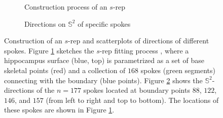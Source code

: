 \documentclass[oneside,11pt]{article}
\begin{document}
\begin{figure}[htpb!]
    \centering
     \begin{subfigure}[b]{0.5\textwidth}
        \caption{\small Construction process of an $s$-rep}
        \label{fig:srepa}
    \end{subfigure}%
    \hspace*{0.25cm}%
    \begin{subfigure}[b]{0.5\textwidth}
        \centering
    \caption{\small Directions on $\mathbb{S}^2$ of specific spokes}
    \label{fig:srepb}
    \end{subfigure}%
    \caption{\small Construction of an $s$-rep and scatterplots of directions of different spokes. Figure \ref{fig:srepa} sketches the $s$-rep fitting process \citep{liu2021fitting}, where a hippocampus surface (blue, top) is parametrized as a set of base skeletal points (red) and a collection of $168$ spokes (green segments) connecting with the boundary (blue points). Figure \ref{fig:srepb} shows the $\mathbb{S}^2$-directions of the $n=177$ spokes located at boundary points $88$, $122$, $146$, and $157$ (from left to right and top to bottom). The locations of these spokes are shown in Figure \ref{fig:srepa}.}
    \label{fig:srep}
\end{figure}
\end{document}
